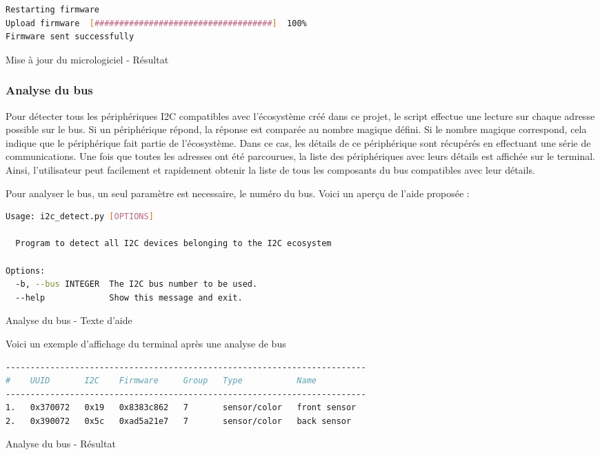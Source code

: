 \begin{listing}[!h]
    \begin{lstlisting}[language=bash]
Restarting firmware
Upload firmware  [####################################]  100%
Firmware sent successfully
    \end{lstlisting}
    \caption{Mise à jour du micrologiciel - Résultat}
\end{listing}

\subsubsection{Analyse du bus}

Pour détecter tous les périphériques I2C compatibles avec l'écosystème créé dans ce projet, le script effectue une lecture sur chaque adresse possible sur le bus.
Si un périphérique répond, la réponse est comparée au nombre magique défini.
Si le nombre magique correspond, cela indique que le périphérique fait partie de l'écosystème.
Dans ce cas, les détails de ce périphérique sont récupérés en effectuant une série de communications.
Une fois que toutes les adresses ont été parcourues, la liste des périphériques avec leurs détails est affichée sur le terminal.
Ainsi, l'utilisateur peut facilement et rapidement obtenir la liste de tous les composants du bus compatibles avec leur détails.

Pour analyser le bus, un seul paramètre est necessaire, le numéro du bus. Voici un aperçu de l'aide proposée :

\begin{listing}[!h]
    \begin{lstlisting}[language=bash]
Usage: i2c_detect.py [OPTIONS]

  Program to detect all I2C devices belonging to the I2C ecosystem

Options:
  -b, --bus INTEGER  The I2C bus number to be used.
  --help             Show this message and exit.
    \end{lstlisting}
    \caption{Analyse du bus - Texte d'aide}
\end{listing}

Voici un exemple d'affichage du terminal après une analyse de bus

\begin{listing}[!h]
    \begin{lstlisting}[language=bash]
-------------------------------------------------------------------------
#    UUID       I2C    Firmware     Group   Type           Name
-------------------------------------------------------------------------
1.   0x370072   0x19   0x8383c862   7       sensor/color   front sensor
2.   0x390072   0x5c   0xad5a21e7   7       sensor/color   back sensor
    \end{lstlisting}
    \caption{Analyse du bus - Résultat}
\end{listing}


